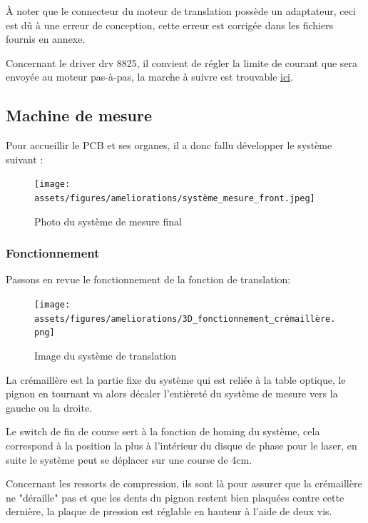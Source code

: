À noter que le connecteur du moteur de translation possède un adaptateur, ceci est dû à une erreur de conception, cette erreur est corrigée
dans les fichiers fournis en annexe.

Concernant le driver drv 8825, il convient de régler la limite de courant que sera envoyée au moteur pas-à-pas, la marche à suivre est trouvable \href{https://www.pololu.com/product/2133}{ici}.\footnotemark



\subsection{Machine de mesure}
Pour accueillir le PCB et ses organes, il a donc fallu développer le système suivant :
\begin{figure}[H]
    \centering
    \texttt{[image: assets/figures/ameliorations/système\_mesure\_front.jpeg]}
    \caption{Photo du système de mesure final}
\end{figure}

\newpage

\subsubsection{Fonctionnement}
Passons en revue le fonctionnement de la fonction de translation:
\begin{figure}[H]
    \centering
    \texttt{[image: assets/figures/ameliorations/3D\_fonctionnement\_crémaillère.png]}
    \caption{Image du système de translation}
\end{figure}
La crémaillère est la partie fixe du système qui est reliée à la table optique, le pignon en tournant va alors décaler l'entièreté du système de mesure
vers la gauche ou la droite.

Le switch de fin de course sert à la fonction de homing du système, cela correspond à la position la plus à l'intérieur du disque
de phase pour le laser, en suite le système peut se déplacer sur une course de 4cm.

Concernant les ressorts de compression, ils sont là pour assurer que la crémaillère ne "déraille" pas et que les dents du pignon restent bien plaquées
contre cette dernière, la plaque de pression est réglable en hauteur à l'aide de deux vis.

\newpage
